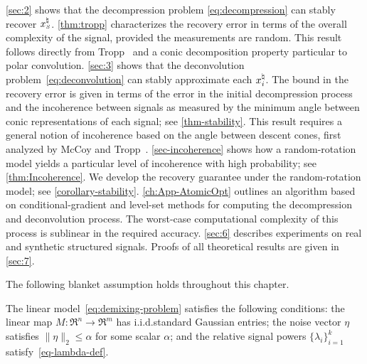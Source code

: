\autoref{sec:2} shows that the decompression problem \eqref{eq:decompression} can stably recover $x_{\scriptscriptstyle S}^{\natural}$. \autoref{thm:tropp} characterizes the recovery error in terms of the overall complexity of the signal, provided the measurements are random. This result follows directly from Tropp~\cite{tropp2015convex} and a conic decomposition property particular to polar convolution. \autoref{sec:3} shows that the deconvolution problem~\eqref{eq:deconvolution} can stably approximate each $x_i^{\natural}$. The bound in the recovery error is given in terms of the error in the initial decompression process and the incoherence between signals as measured by the minimum angle between conic representations of each signal; see \autoref{thm-stability}. This result requires a general notion of incoherence based on the angle between descent cones, first analyzed by McCoy and Tropp~\cite{mccoy2013achievable}.  \autoref{sec-incoherence} shows how a random-rotation model yields a particular level of incoherence with high probability; see \autoref{thm:Incoherence}. We develop the recovery guarantee under the random-rotation model; see \autoref{corollary-stability}.  \autoref{ch:App-AtomicOpt} outlines an algorithm based on conditional-gradient and level-set methods for computing the decompression and deconvolution process. The worst-case computational complexity of this process is sublinear in the required accuracy. \autoref{sec:6} describes experiments on real and synthetic structured signals. Proofs of all theoretical results are given in \autoref{sec:7}.

The following blanket assumption holds throughout this chapter.
\begin{assumption}\label{assume-blanket}
  The linear model~\eqref{eq:demixing-problem} satisfies the following conditions: the linear map
  $M:\Re^n\to\Re^m$ has i.i.d.\@ standard Gaussian entries; the noise vector $\eta$ satisfies $\|\eta\|_2\leq \alpha$ for some scalar $\alpha$; and the relative signal powers $\{\lambda_i\}_{i=1}^k$ satisfy~\eqref{eq-lambda-def}.
\end{assumption} 


